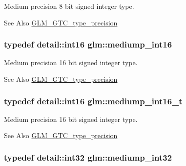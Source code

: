 Medium precision 8 bit signed integer type. \begin{DoxySeeAlso}{See Also}
\hyperlink{group__gtc__type__precision}{G\-L\-M\-\_\-\-G\-T\-C\-\_\-type\-\_\-precision} 
\end{DoxySeeAlso}
\hypertarget{group__gtc__type__precision_ga4611997edb6c61606daa11990cf08798}{
\subsubsection[{mediump\-\_\-int16}]{\setlength{\rightskip}{0pt plus 5cm}typedef detail\-::int16 {\bf glm\-::mediump\-\_\-int16}}}\label{group__gtc__type__precision_ga4611997edb6c61606daa11990cf08798}
Medium precision 16 bit signed integer type. \begin{DoxySeeAlso}{See Also}
\hyperlink{group__gtc__type__precision}{G\-L\-M\-\_\-\-G\-T\-C\-\_\-type\-\_\-precision} 
\end{DoxySeeAlso}
\hypertarget{group__gtc__type__precision_ga478fab608cf43040013d719a3e03b194}{
\subsubsection[{mediump\-\_\-int16\-\_\-t}]{\setlength{\rightskip}{0pt plus 5cm}typedef detail\-::int16 {\bf glm\-::mediump\-\_\-int16\-\_\-t}}}\label{group__gtc__type__precision_ga478fab608cf43040013d719a3e03b194}
Medium precision 16 bit signed integer type. \begin{DoxySeeAlso}{See Also}
\hyperlink{group__gtc__type__precision}{G\-L\-M\-\_\-\-G\-T\-C\-\_\-type\-\_\-precision} 
\end{DoxySeeAlso}
\hypertarget{group__gtc__type__precision_ga0660a752402702f420f13c686a7fff29}{
\subsubsection[{mediump\-\_\-int32}]{\setlength{\rightskip}{0pt plus 5cm}typedef detail\-::int32 {\bf glm\-::mediump\-\_\-int32}}}\label{group__gtc__type__precision_ga0660a752402702f420f13c686a7fff29}
